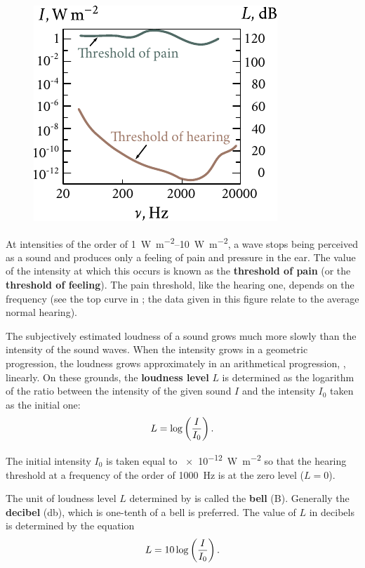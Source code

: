 \begin{figure}[t]
	\begin{center}
		\includegraphics[scale=1]{figures/ch_14/fig_14_13.pdf}
		\caption[]{}
		\label{fig:14_13}
	\end{center}
	\vspace{-0.8cm}
\end{figure}

At intensities of the order of \SIrange{1}{10}{\watt\per\metre\squared}, a wave stops being perceived as a sound and produces only a feeling of pain and pressure in the ear.
The value of the intensity at which this occurs is known as the \textbf{threshold of pain} (or the \textbf{threshold of feeling}).
The pain threshold, like the hearing one, depends on the frequency (see the top curve in ; the data given in this figure relate to the average normal hearing).

The subjectively estimated loudness of a sound grows much more slowly than the intensity of the sound waves.
When the intensity grows in a geometric progression, the loudness grows approximately in an arithmetical progression, \ie, linearly.
On these grounds, the \textbf{loudness level} $L$ is determined as the logarithm of the ratio between the intensity of the given sound $I$ and the intensity $I_0$ taken as the initial one:
\begin{equation}\label{eq:14_62}
	L = \log\left(\frac{I}{I_0}\right).
\end{equation}

\noindent
The initial intensity $I_0$ is taken equal to \SI{e-12}{\watt\per\metre\squared} so that the hearing threshold at a frequency of the order of \SI{1000}{\hertz} is at the zero level ($L = 0$).

The unit of loudness level $L$ determined by  is called the \textbf{bell} (B).
Generally the \textbf{decibel} (\si{\decibel}), which is one-tenth of a bell is preferred.
The value of $L$ in decibels is determined by the equation
\begin{equation}\label{eq:14_63}
	L = 10 \log\left(\frac{I}{I_0}\right).
\end{equation}

